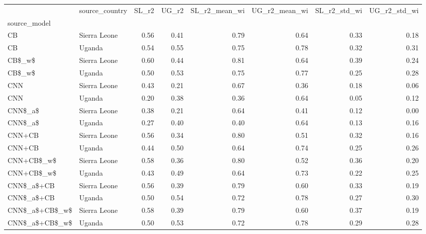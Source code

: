 \begin{tabular}{llrrrrrr}
\toprule
{} & source\_country &  SL\_r2 &  UG\_r2 &  SL\_r2\_mean\_wi &  UG\_r2\_mean\_wi &  SL\_r2\_std\_wi &  UG\_r2\_std\_wi \\
source\_model   &                &        &        &                &                &               &               \\
\midrule
CB             &   Sierra Leone &   0.56 &   0.41 &           0.79 &           0.64 &          0.33 &          0.18 \\
CB             &         Uganda &   0.54 &   0.55 &           0.75 &           0.78 &          0.32 &          0.31 \\
CB\$\_w\$         &   Sierra Leone &   0.60 &   0.44 &           0.81 &           0.64 &          0.39 &          0.24 \\
CB\$\_w\$         &         Uganda &   0.50 &   0.53 &           0.75 &           0.77 &          0.25 &          0.28 \\
CNN            &   Sierra Leone &   0.43 &   0.21 &           0.67 &           0.36 &          0.18 &          0.06 \\
CNN            &         Uganda &   0.20 &   0.38 &           0.36 &           0.64 &          0.05 &          0.12 \\
CNN\$\_a\$        &   Sierra Leone &   0.38 &   0.21 &           0.64 &           0.41 &          0.12 &          0.00 \\
CNN\$\_a\$        &         Uganda &   0.27 &   0.40 &           0.40 &           0.64 &          0.13 &          0.16 \\
CNN+CB         &   Sierra Leone &   0.56 &   0.34 &           0.80 &           0.51 &          0.32 &          0.16 \\
CNN+CB         &         Uganda &   0.44 &   0.50 &           0.64 &           0.74 &          0.25 &          0.26 \\
CNN+CB\$\_w\$     &   Sierra Leone &   0.58 &   0.36 &           0.80 &           0.52 &          0.36 &          0.20 \\
CNN+CB\$\_w\$     &         Uganda &   0.43 &   0.49 &           0.64 &           0.73 &          0.22 &          0.25 \\
CNN\$\_a\$+CB     &   Sierra Leone &   0.56 &   0.39 &           0.79 &           0.60 &          0.33 &          0.19 \\
CNN\$\_a\$+CB     &         Uganda &   0.50 &   0.54 &           0.72 &           0.78 &          0.27 &          0.30 \\
CNN\$\_a\$+CB\$\_w\$ &   Sierra Leone &   0.58 &   0.39 &           0.79 &           0.60 &          0.37 &          0.19 \\
CNN\$\_a\$+CB\$\_w\$ &         Uganda &   0.50 &   0.53 &           0.72 &           0.78 &          0.29 &          0.28 \\
\bottomrule
\end{tabular}
